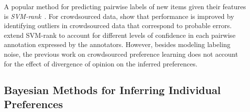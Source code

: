 A popular method for predicting pairwise labels of new items given their features is 
\emph{SVM-rank}~\cite{joachims2002optimizing}.
For crowdsourced data, \citet{fu2016robust} show that performance is improved by identifying outliers in crowdsourced data
that correspond to probable errors.
\citet{uchida2017entity} extend SVM-rank to account for different levels of confidence in each pairwise annotation expressed
by the annotators.
However, besides modeling labeling noise, 
the previous work on crowdsourced preference learning does not 
account for the effect of divergence of opinion on the inferred preferences.

\subsection{Bayesian Methods for Inferring Individual Preferences}

